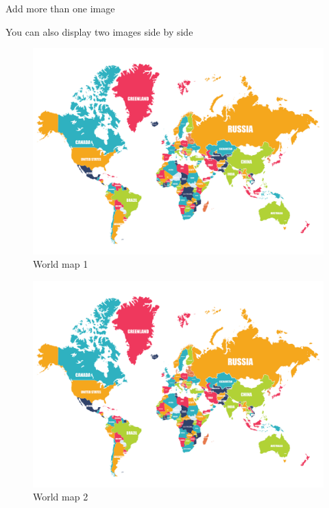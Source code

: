 \documentclass{beamer}
\begin{document}
\begin{frame}{Add more than one image}

You can also display two images side by side

	\begin{multicols}{2}
		
		\begin{figure}
			\centering
			\includegraphics[width=\linewidth]{img/world-map}
			\caption{World map 1}
			\label{fig:world-map1}
		\end{figure}
		\begin{figure}
			\centering
			\includegraphics[width=\linewidth]{img/world-map}
			\caption{World map 2}
			\label{fig:world-map2}
		\end{figure}
	
	\end{multicols}

\end{frame}
\end{document}
